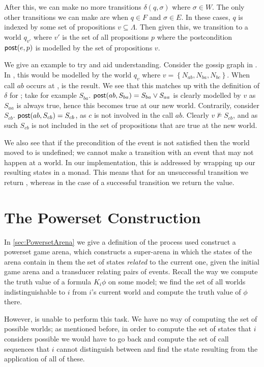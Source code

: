 \documentclass[10pt, a4paper]{report}
\begin{document}
After this, we can make no more transitions $\delta(q, \sigma)$ where $\sigma
\in W$. The only other transitions we can make are when $q \in F$ and $\sigma
\in E$. In these cases, $q$ is indexed by some set of propositions $v \subseteq
\Lambda$. Then given this, we transition to a world $q_{v'}$ where $v'$ is the
set of all propositions $p$ where the postcondition $\textsf{post}(e, p)$ is modelled by
the set of propositions $v$. 

We give an example to try and aid understanding. Consider the gossip graph in
. In \mestar, this would be modelled by the world $q_v$
where $v = \left\{ N_{ab}, N_{ba}, N_{bc} \right\}$. When call $ab$ occurs at
,  is the result. We see that
this matches up with the definition of $\delta$ for \mestar; take for example
$S_{ba}$. $\textsf{post}(ab, S_{ba}) = S_{ba} \lor S_{aa}$ is clearly modelled by $v$ as
$S_{aa}$ is always true, hence this becomes true at our new world. Contrarily,
consider $S_{cb}$. $\textsf{post}(ab, S_{cb}) = S_{cb}$, as $c$ is not involved in the
call $ab$. Clearly $v \not \models S_{cb}$, and as such $S_{cb}$ is not included
in the set of propositions that are true at the new world.

We also see that if the precondition of the event is not satisfied then the
world moved to is undefined; we cannot make a transition with an event that may
not happen at a world. In our implementation, this is addressed by wrapping up
our resulting states in a  monad. This means that for an unsuccessful
transition we return , whereas in the case of a successful
transition we return  the value. 

\section{The Powerset Construction}
\label{sec:PowersetAdapted}

In \ref{sec:PowersetArena} we give a definition of the process used construct a
powerset game arena, which constructs a super-arena in which the states of the
arena contain in them the set of states \emph{related} to the current one, given
the initial game arena and a transducer relating pairs of events. Recall the way
we compute the truth value of a formula $K_i \phi$ on some model; we find the
set of all worlds indistinguishable to $i$ from $i$'s current world and compute
the truth value of $\phi$ there.

However, \mestar is unable to perform this task. We have no way of computing the
set of possible worlds; as mentioned before, in order to compute the set
of states that $i$ considers possible we would have to go back and compute the
set of call sequences that $i$ cannot distinguish between and find the state
resulting from the application of all of these. 
\end{document}
